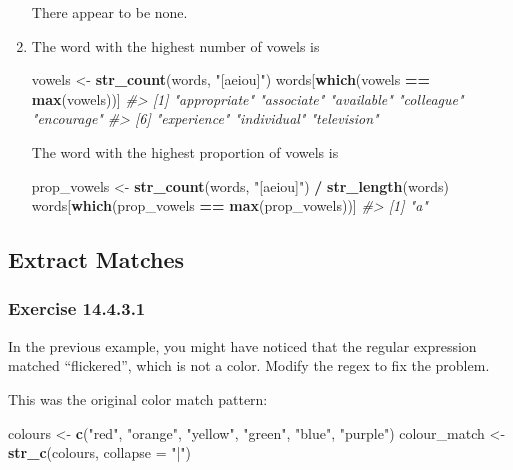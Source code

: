 \documentclass[]{book}
\newenvironment{Shaded}{\begin{snugshade}}{\end{snugshade}}
\newcommand{\CommentTok}[1]{\textcolor[rgb]{0.56,0.35,0.01}{\textit{#1}}}
\newcommand{\DataTypeTok}[1]{\textcolor[rgb]{0.13,0.29,0.53}{#1}}
\newcommand{\KeywordTok}[1]{\textcolor[rgb]{0.13,0.29,0.53}{\textbf{#1}}}
\newcommand{\NormalTok}[1]{#1}
\newcommand{\OperatorTok}[1]{\textcolor[rgb]{0.81,0.36,0.00}{\textbf{#1}}}
\newcommand{\StringTok}[1]{\textcolor[rgb]{0.31,0.60,0.02}{#1}}
\theoremstyle{plain}
\theoremstyle{remark}
\theoremstyle{definition}
\theoremstyle{definition}
\theoremstyle{definition}
\theoremstyle{remark}
\begin{document}
\begin{enumerate}
  There appear to be none.
\item
  The word with the highest number of vowels is

\begin{Shaded}
\begin{Highlighting}[]
\NormalTok{vowels <-}\StringTok{ }\KeywordTok{str_count}\NormalTok{(words, }\StringTok{"[aeiou]"}\NormalTok{)}
\NormalTok{words[}\KeywordTok{which}\NormalTok{(vowels }\OperatorTok{==}\StringTok{ }\KeywordTok{max}\NormalTok{(vowels))]}
\CommentTok{#> [1] "appropriate" "associate"   "available"   "colleague"   "encourage"  }
\CommentTok{#> [6] "experience"  "individual"  "television"}
\end{Highlighting}
\end{Shaded}

  The word with the highest proportion of vowels is

\begin{Shaded}
\begin{Highlighting}[]
\NormalTok{prop_vowels <-}\StringTok{ }\KeywordTok{str_count}\NormalTok{(words, }\StringTok{"[aeiou]"}\NormalTok{) }\OperatorTok{/}\StringTok{ }\KeywordTok{str_length}\NormalTok{(words)}
\NormalTok{words[}\KeywordTok{which}\NormalTok{(prop_vowels }\OperatorTok{==}\StringTok{ }\KeywordTok{max}\NormalTok{(prop_vowels))]}
\CommentTok{#> [1] "a"}
\end{Highlighting}
\end{Shaded}
\end{enumerate}

\hypertarget{extract-matches}{%
\subsection{Extract Matches}\label{extract-matches}}

\hypertarget{exercise-14.4.3.1}{%
\subsubsection*{\texorpdfstring{Exercise
{14.4.3.1}}{Exercise 14.4.3.1}}\label{exercise-14.4.3.1}}

In the previous example, you might have noticed that the regular
expression matched ``flickered'', which is not a color. Modify the regex
to fix the problem.

This was the original color match pattern:

\begin{Shaded}
\begin{Highlighting}[]
\NormalTok{colours <-}\StringTok{ }\KeywordTok{c}\NormalTok{(}\StringTok{"red"}\NormalTok{, }\StringTok{"orange"}\NormalTok{, }\StringTok{"yellow"}\NormalTok{, }\StringTok{"green"}\NormalTok{, }\StringTok{"blue"}\NormalTok{, }\StringTok{"purple"}\NormalTok{)}
\NormalTok{colour_match <-}\StringTok{ }\KeywordTok{str_c}\NormalTok{(colours, }\DataTypeTok{collapse =} \StringTok{"|"}\NormalTok{)}
\end{Highlighting}
\end{Shaded}
\end{document}
